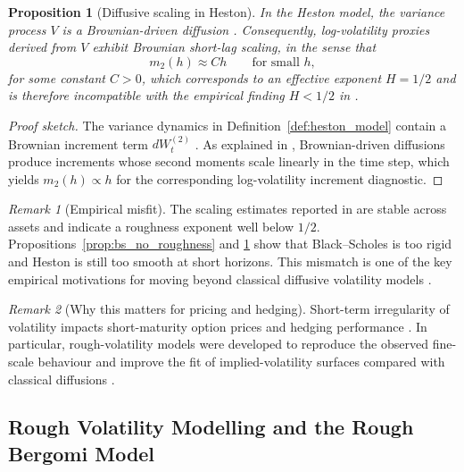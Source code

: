 \documentclass[12pt,a4paper]{article}
\theoremstyle{definition}
\theoremstyle{plain}
\newtheorem{proposition}{Proposition}[section]
\theoremstyle{remark}
\newtheorem{remark}{Remark}[section]
\theoremstyle{plain}
\begin{document}
\begin{proposition}[Diffusive scaling in Heston]
\label{prop:heston_diffusive_scaling}
In the Heston model, the variance process $V$ is a Brownian-driven diffusion \cite{Heston1993}. 
Consequently, log-volatility proxies derived from $V$ exhibit Brownian short-lag scaling, in the sense that
\[
m_2(h)\approx C h
\qquad\text{for small }h,
\]
for some constant $C>0$, which corresponds to an effective exponent $H=1/2$ and is therefore incompatible with the empirical finding $H<1/2$ in \cite{GatheralRough}.
\end{proposition}

\begin{proof}[Proof sketch]
The variance dynamics in Definition~\ref{def:heston_model} contain a Brownian increment term $dW_t^{(2)}$ \cite{Heston1993}. 
As explained in \cite{GatheralRough}, Brownian-driven diffusions produce increments whose second moments scale linearly in the time step, which yields $m_2(h)\propto h$ for the corresponding log-volatility increment diagnostic.
\end{proof}

\begin{remark}[Empirical misfit]
\label{rem:empirical_misfit_classical}
The scaling estimates reported in \cite{GatheralRough} are stable across assets and indicate a roughness exponent well below $1/2$. 
Propositions~\ref{prop:bs_no_roughness} and \ref{prop:heston_diffusive_scaling} show that Black--Scholes is too rigid and Heston is still too smooth at short horizons. 
This mismatch is one of the key empirical motivations for moving beyond classical diffusive volatility models \cite{GatheralRough,BayerFriz2016}.
\end{remark}

\begin{remark}[Why this matters for pricing and hedging]
\label{rem:why_misfit_matters}
Short-term irregularity of volatility impacts short-maturity option prices and hedging performance \cite{GatheralRough}. 
In particular, rough-volatility models were developed to reproduce the observed fine-scale behaviour and improve the fit of implied-volatility surfaces compared with classical diffusions \cite{GatheralRough,BayerFriz2016}. 
\end{remark}

\subsection{Rough Volatility Modelling and the Rough Bergomi Model}
\label{subsec:rough_bergomi_model}
\end{document}
